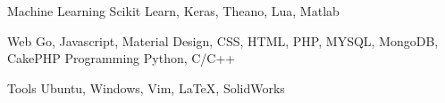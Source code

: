 

\begin{cvskills}

  \cvskill
    {Machine Learning} %
    {Scikit Learn, Keras, Theano, Lua, Matlab} %

  \cvskill
    {Web} %
    {Go, Javascript, Material Design, CSS, HTML, PHP, MYSQL, MongoDB, CakePHP} %
	\cvskill
	{Programming} %
	{Python, C/C++} %

  \cvskill
  {Tools} %
  {Ubuntu, Windows, Vim, \LaTeX, SolidWorks} %
\end{cvskills}
